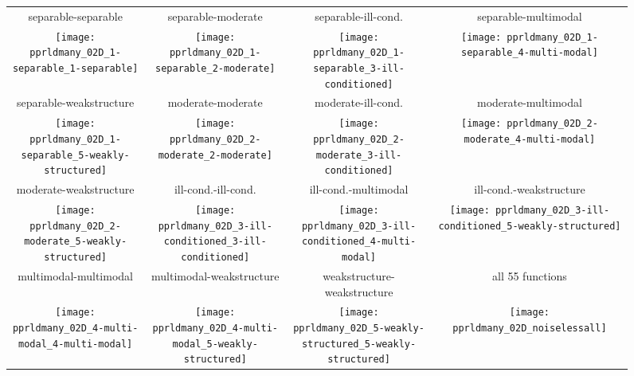 \documentclass{sig-alternate}
\begin{document}


\begin{figure*}
\begin{tabular}{@{\hspace*{-0.009\textwidth}}c@{\hspace*{-0.014\textwidth}}c@{\hspace*{-0.016\textwidth}}c@{\hspace*{-0.02\textwidth}}c}
separable-separable & separable-moderate & separable-ill-cond. & separable-multimodal\\
\texttt{[image: pprldmany\_02D\_1-separable\_1-separable]} &
\texttt{[image: pprldmany\_02D\_1-separable\_2-moderate]} &
\texttt{[image: pprldmany\_02D\_1-separable\_3-ill-conditioned]} &
\texttt{[image: pprldmany\_02D\_1-separable\_4-multi-modal]}\\
separable-weakstructure & moderate-moderate & moderate-ill-cond. & moderate-multimodal\\
\texttt{[image: pprldmany\_02D\_1-separable\_5-weakly-structured]} &
\texttt{[image: pprldmany\_02D\_2-moderate\_2-moderate]} &
\texttt{[image: pprldmany\_02D\_2-moderate\_3-ill-conditioned]} &
\texttt{[image: pprldmany\_02D\_2-moderate\_4-multi-modal]}\\
moderate-weakstructure & ill-cond.-ill-cond. & ill-cond.-multimodal & ill-cond.-weakstructure\\
\texttt{[image: pprldmany\_02D\_2-moderate\_5-weakly-structured]} &
\texttt{[image: pprldmany\_02D\_3-ill-conditioned\_3-ill-conditioned]} &
\texttt{[image: pprldmany\_02D\_3-ill-conditioned\_4-multi-modal]} &
\texttt{[image: pprldmany\_02D\_3-ill-conditioned\_5-weakly-structured]} \\
multimodal-multimodal & multimodal-weakstructure & weakstructure-weakstructure & all 55 functions\\
\texttt{[image: pprldmany\_02D\_4-multi-modal\_4-multi-modal]} &
\texttt{[image: pprldmany\_02D\_4-multi-modal\_5-weakly-structured]} &
\texttt{[image: pprldmany\_02D\_5-weakly-structured\_5-weakly-structured]} &
\texttt{[image: pprldmany\_02D\_noiselessall]}
\vspace*{-0.5ex}
\end{tabular}
 \caption{\label{fig:ECDFsGroupsFive}
 }
\end{figure*}
\end{document}
